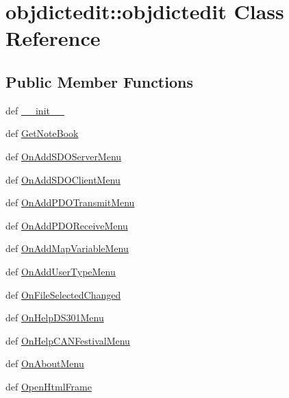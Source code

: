 \hypertarget{classobjdictedit_1_1objdictedit}{
\section{objdictedit::objdictedit Class Reference}
\label{classobjdictedit_1_1objdictedit}
}
\subsection*{Public Member Functions}
\begin{CompactItemize}
\item 
def \hyperlink{classobjdictedit_1_1objdictedit_4abb1c197354d05c25e9ca9e0ad49f66}{\_\-\_\-init\_\-\_\-}
\item 
def \hyperlink{classobjdictedit_1_1objdictedit_38ba116f55e22e5b8e2504c44b1c9722}{Get\-Note\-Book}
\item 
def \hyperlink{classobjdictedit_1_1objdictedit_2d25a6a40a74e893aebce26405a0d8f7}{On\-Add\-SDOServer\-Menu}
\item 
def \hyperlink{classobjdictedit_1_1objdictedit_01b55597ca103c08c89d012ad6dced3d}{On\-Add\-SDOClient\-Menu}
\item 
def \hyperlink{classobjdictedit_1_1objdictedit_cc73bf94427a95e3399e56d7f275ab77}{On\-Add\-PDOTransmit\-Menu}
\item 
def \hyperlink{classobjdictedit_1_1objdictedit_a5f8ca2068f63b91c92f40f9756400f6}{On\-Add\-PDOReceive\-Menu}
\item 
def \hyperlink{classobjdictedit_1_1objdictedit_c3a4bad410a580a07dad03a4f8ba121c}{On\-Add\-Map\-Variable\-Menu}
\item 
def \hyperlink{classobjdictedit_1_1objdictedit_666aae02d9569cfa32fc26329154da60}{On\-Add\-User\-Type\-Menu}
\item 
def \hyperlink{classobjdictedit_1_1objdictedit_8555948b7b1aecf2514b6b9ff4726635}{On\-File\-Selected\-Changed}
\item 
def \hyperlink{classobjdictedit_1_1objdictedit_8b0876dac5e3046f93854665bd9be3aa}{On\-Help\-DS301Menu}
\item 
def \hyperlink{classobjdictedit_1_1objdictedit_a498874fef86060832c7e90b6e028629}{On\-Help\-CANFestival\-Menu}
\item 
def \hyperlink{classobjdictedit_1_1objdictedit_a660005de7e719ce7396beeea0ece661}{On\-About\-Menu}
\item 
def \hyperlink{classobjdictedit_1_1objdictedit_3779119b638995bf42810727e9562bec}{Open\-Html\-Frame}

\end{CompactItemize}
